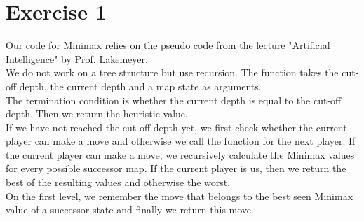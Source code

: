 \section{Exercise 1}
Our code for Minimax relies on the pseudo code from the lecture "Artificial Intelligence" by Prof. Lakemeyer.\\ We do not work on a tree structure but use recursion. The function takes the cut-off depth, the current depth and a map state as arguments.\\
The termination condition is whether the current depth is equal to the cut-off depth. Then we return the heuristic value.\\
If we have not reached the cut-off depth yet, we first check whether the current player can make a move and otherwise we call the function for the next player. If the current player can make a move, we recursively calculate the Minimax values for every possible successor map. If the current player is us, then we return the best of the resulting values and otherwise the worst.\\
On the first level, we remember the move that belongs to the best seen Minimax value of a successor state and finally we return this move.